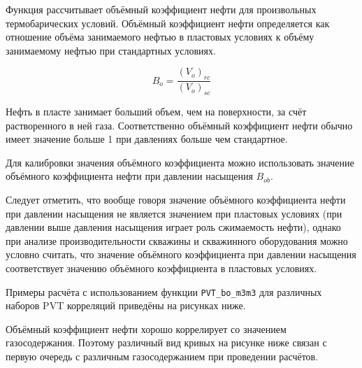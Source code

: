Функция рассчитывает объёмный коэффициент нефти для произвольных термобарических условий. 
Объёмный коэффициент нефти определяется как отношение объёма занимаемого нефтью в пластовых условиях к объёму занимаемому нефтью при стандартных условиях. 

$$B_o = \frac{(V_o)_{rc}}{(V_o)_{sc}}$$

Нефть в пласте занимает больший объем, чем на поверхности, за счёт растворенного в ней газа. Соответственно объёмный коэффициент нефти обычно имеет значение больше 1 при давлениях больше чем стандартное.

Для калибровки значения объёмного коэффициента можно использовать значение объёмного коэффициента нефти при давлении насыщения $B_{ob}$. 

Следует отметить, что вообще говоря значение объёмного коэффициента нефти при давлении насыщения не является значением при пластовых условиях (при давлении выше давления насыщения играет роль сжимаемость нефти), однако при анализе производительности скважины и скважинного оборудования можно условно считать, что значение объёмного коэффициента при давлении насыщения соответствует значению  объёмного коэффициента в пластовых условиях.  


Примеры расчёта с использованием функции \texttt{PVT_bo_m3m3} для различных наборов PVT корреляций приведёны на рисунках ниже.

Объёмный коэффициент нефти хорошо коррелирует со значением газосодержания. Поэтому различный вид кривых на рисунке ниже связан с первую очередь с различным газосодержанием при проведении расчётов.

\newcommand{\BoDataFile}{data/Bo_P_data.txt}

